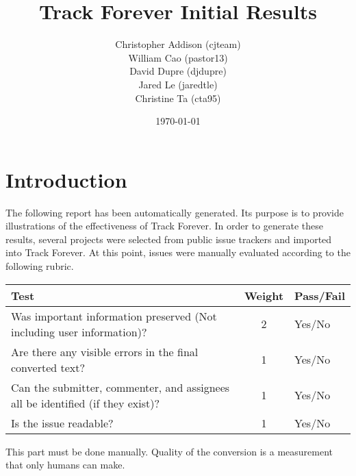 \documentclass{article}
\begin{document}
\title{Track Forever Initial Results}
\date{\today}
\author{ Christopher Addison (cjteam) \\
         William Cao (pastor13) \\
         David Dupre (djdupre) \\
         Jared Le (jaredtle) \\
         Christine Ta (cta95) }
\maketitle


\section{Introduction}
    The following report has been automatically generated. Its purpose is to provide 
    illustrations of the effectiveness of Track Forever. In order to generate these results, 
    several projects were selected from public issue trackers and imported into Track Forever. 
    At this point, issues were manually evaluated according to the following rubric.

    \begin{center}
        \renewcommand{\arraystretch}{1.5}
        \begin{tabular}{ p{6cm} | c | l }
        Test & Weight & Pass/Fail \\ \hline
        Was important information preserved (Not including user information)? & 2 & Yes/No \\
        Are there any visible errors in the final converted text? & 1 & Yes/No \\
        Can the submitter, commenter, and assignees all be identified (if they exist)? & 1 & Yes/No \\
        Is the issue readable? & 1 & Yes/No \\
        \end{tabular}
    \end{center}

    This part must be done manually. Quality of the conversion is a measurement that only humans can make.
\end{document}
